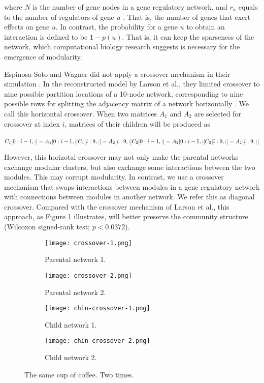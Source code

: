 where $N$ is the number of gene nodes in a gene regulatory network, and $r_{u}$ equals to the number of regulators of gene $u$ \cite{espinosa2010specialization}. That is, the number of genes that exert effects on gene $u$. In contrast, the probability for a gene $u$ to obtain an interaction is defined to be $1-p(u)$. That is, it can keep the sparseness of the network, which computational biology research suggests is necessary for the emergence of modularity. 

Espinosa-Soto and Wagner did not apply a crossover mechanism in their simulation \cite{espinosa2010specialization}. In the reconstructed model by Larson et al., they limited crossover to nine possible partition locations of a 10-node network, corresponding to nine possible rows for splitting the adjacency matrix of a network horizontally \cite{larson2016recombination}. We call this horizontal crossover. When two matrices $A_{1}$ and $A_{2}$ are selected for crossover at index $i$, matrices of their children will be produced as \\ \\
$C_{1}[0: i-1, :] = A_{1}[0: i-1, :]\\
C_{1}[i: 9, :] = A_{2}[i: 9, :]\\
C_{2}[0: i-1, :] = A_{2}[0: i-1, :]\\
C_{2}[i: 9, :] = A_{1}[i: 9, :]\\$

However, this horizotal crossover may not only make the parental networks exchange modular clusters, but also exchange some interactions between the two modules. This may corrupt modularity. In contrast, we use a crossover mechanism that swaps interactions between modules in a gene regulatory network with connections between modules in another network. We refer this as diagonal crossover. Compared with the crossover mechanism of Larson et al., this approach, as Figure \ref{fig:diagnonal-crossover} illustrates, will better preserve the community structure (Wilcoxon signed-rank test; $p<0.0372$).

\begin{figure}[h!]
	\centering
	\begin{subfigure}[b]{0.4\linewidth}
		\texttt{[image: crossover-1.png]}
		\caption{Parental network 1.}
	\end{subfigure}
	\begin{subfigure}[b]{0.4\linewidth}
		\texttt{[image: crossover-2.png]}
		\caption{Parental network 2.}
	\end{subfigure}
	\begin{subfigure}[b]{0.4\linewidth}
		\texttt{[image: chin-crossover-1.png]}
		\caption{Child network 1.}
	\end{subfigure}
	\begin{subfigure}[b]{0.4\linewidth}
		\texttt{[image: chin-crossover-2.png]}
		\caption{Child network 2.}
	\end{subfigure}
	\caption{The same cup of coffee. Two times.}
	\label{fig:diagnonal-crossover}
\end{figure}

